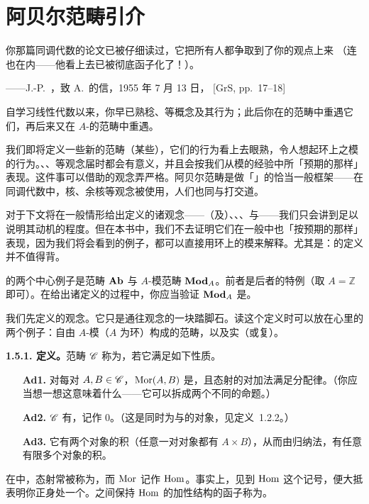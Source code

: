 \section{阿贝尔范畴引介}

\epigraph
  {你那篇同调代数的论文已被仔细读过，它把所有人都争取到了你的观点上来
   （连\trDieudonne{}也在内——他看上去已被彻底函子化了！）。}
  {——J.-P.~\trSerre，致 A.~\trGrothendieck{}的信，1955 年 7 月 13 日，
   [GrS, pp.~17--18]}

自学习线性代数以来，你早已熟稔\trKernel、\trCokernel{}等概念及其行为；此后你在\trAbelianGroups{}的范畴中重遇它们，再后来又在 $A$-\trModule{}的范畴中重遇。

我们即将定义一些新的范畴（某些\trSheaf），它们的行为看上去眼熟，令人想起环上之模的行为。\trKernel、\trCokernel、\trImage{}等观念届时都会有意义，并且会按我们从模的经验中所「预期的那样」表现。这件事可以借助\trAbelianCategory{}的观念弄严格。阿贝尔范畴是做「\trHomologicalAlgebra」的恰当一般框架——在同调代数中，核、余核等观念被使用，人们也同\trComplexes{}与\trExactSequence{}打交道。

对于下文将在一般情形给出定义的诸观念——\trMonomorphism（及\trSubobject）、\trEpimorphism、\trKernel、\trCokernel{}与\trImage——我们只会讲到足以说明其动机的程度。但在本书中，我们不去证明它们在一般\trAbelianCategory{}中也「按预期的那样」表现，因为我们将会看到的例子，都可以直接用环上的模来解释。尤其是：\trAbelianCategory{}的定义并不值得背。

\trAbelianCategory{}的两个中心例子是\trAbelianGroups{}范畴 $\mathbf{Ab}$ 与 $A$-模范畴 $\mathbf{Mod}_{A}$。前者是后者的特例（取 $A=\mathbb{Z}$ 即可）。在给出诸定义的过程中，你应当验证 $\mathbf{Mod}_{A}$ 是\trAbelianCategory。

我们先定义\trAdditiveCategory{}的观念。它只是通往\trAbelianCategory{}观念的一块踏脚石。读这个定义时可以放在心里的两个例子：自由 $A$-模（$A$ 为环）构成的范畴，以及实（或复）\trBanachSpace。

\textbf{1.5.1. 定义。}\quad 范畴 $\mathscr{C}$ 称为\trAdditiveCategory，若它满足如下性质。
\begin{itemize}[leftmargin=2.6em,itemsep=2pt,topsep=3pt]
\item[\textbf{Ad1.}] 对每对 $A,B\in\mathscr{C}$，$\operatorname{Mor}(A,B)$ 是\trAbelianGroups，且态射的\trComposition{}对加法满足分配律。（你应当想一想这意味着什么——它可以拆成两个不同的命题。）
\item[\textbf{Ad2.}] $\mathscr{C}$ 有\trZeroObject，记作 $0$。（这是同时为\trInitialObject{}与\trFinalObject{}的对象，见定义~1.2.2。）
\item[\textbf{Ad3.}] 它有两个对象的积（任意一对对象都有 $A\times B$），从而由归纳法，有任意有限多个对象的积。
\end{itemize}
在\trAdditiveCategory{}中，态射常被称为\trHomomorphism，而 $\operatorname{Mor}$ 记作 $\operatorname{Hom}$。事实上，见到 $\operatorname{Hom}$ 这个记号，便大抵表明你正身处一个\trAdditiveCategory。\trAdditiveCategory{}之间保持 $\operatorname{Hom}$ 的加性结构的函子称为\trAdditiveFunctor。

